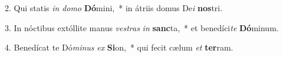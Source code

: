 2. Qui statis \textit{in} \textit{do}\textit{mo} \textbf{Dó}mini,~*  in átriis domus De\textit{i} \textbf{nos}tri.\

3. In nóctibus extóllite manus \textit{ves}\textit{tras} \textit{in} \textbf{sanc}ta,~*  et benedíci\textit{te} \textbf{Dó}minum.\

4. Benedícat te Dó\textit{mi}\textit{nus} \textit{ex} \textbf{Si}on,~*  qui fecit cælum \textit{et} \textbf{ter}ram.\

